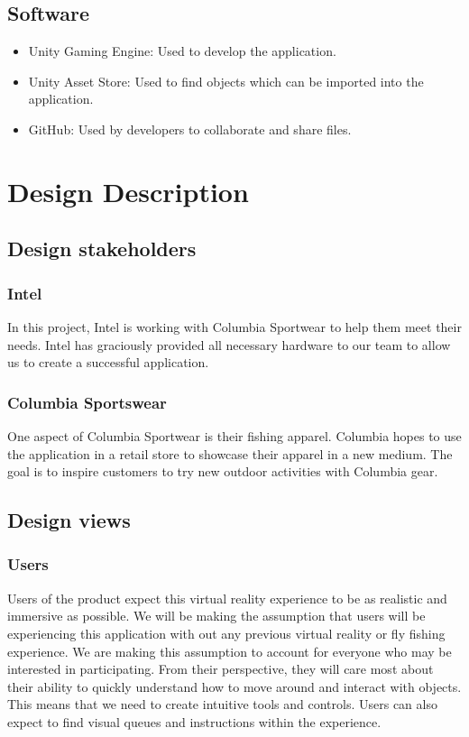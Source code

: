 \documentclass[10pt,journal,compsoc,onecolumn, draftclsnofoot]{IEEEtran}
\begin{document}
\subsection{Software}
\begin{itemize}
  \item Unity Gaming Engine: Used to develop the application.
  \item Unity Asset Store: Used to find objects which can be imported into the application.
  \item GitHub: Used by developers to collaborate and share files.
\end{itemize}


\section{Design Description}

\subsection{Design stakeholders}
\subsubsection{Intel}
In this project, Intel is working with Columbia Sportwear to help them meet their needs.
Intel has graciously provided all necessary hardware to our team to allow us to create a successful application.

\subsubsection{Columbia Sportswear}
One aspect of Columbia Sportwear is their fishing apparel.
Columbia hopes to use the application in a retail store to showcase their apparel in a new medium.
The goal is to inspire customers to try new outdoor activities with Columbia gear.

\subsection{Design views}
\subsubsection{Users}
Users of the product expect this virtual reality experience to be as realistic and immersive as possible. We will be making the assumption that users will be experiencing this application with out any previous virtual reality or fly fishing experience. We are making this assumption to account for everyone who may be interested in participating. From their perspective, they will care most about their ability to quickly understand how to move around and interact with objects. This means that we need to create intuitive tools and controls. Users can also expect to find visual queues and instructions within the experience.
\end{document}
